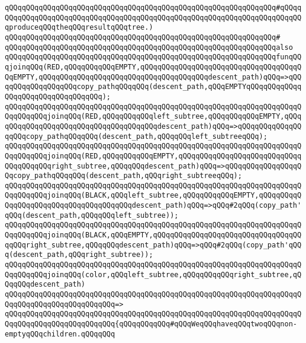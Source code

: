 \verb|qQQqqQQqqQQqqQQqqQQqqQQqqQQqqQQqqQQqqQQqqQQqqQQqqQQqqQQqqQQqqQQq#qQQqqQQqqQQqqQQqqQQqqQQqqQQqqQQqqQQqqQQqqQQqqQQqqQQqqQQqqQQqqQQqqQQqqQQqqQQqproduceqQQqtheqQQqresultqQQqtree.)|\newline
\verb|qQQqqQQqqQQqqQQqqQQqqQQqqQQqqQQqqQQqqQQqqQQqqQQqqQQqqQQqqQQqqQQq#|\newline
\verb|qQQqqQQqqQQqqQQqqQQqqQQqqQQqqQQqqQQqqQQqqQQqqQQqqQQqqQQqqQQqqQQqalso|\newline
\verb|qQQqqQQqqQQqqQQqqQQqqQQqqQQqqQQqqQQqqQQqqQQqqQQqqQQqqQQqqQQqqQQqfunqQQqjoinqQQq(RED,qQQqqQQqqQQqEMPTY,qQQqqQQqqQQqqQQqqQQqqQQqqQQqqQQqqQQqqQQqEMPTY,qQQqqQQqqQQqqQQqqQQqqQQqqQQqqQQqqQQqqQQqdescent_path)qQQq=>qQQqqQQqqQQqqQQqqQQqcopy_pathqQQqqQQq(descent_path,qQQqEMPTYqQQqqQQqqQQqqQQqqQQqqQQqqQQqqQQqqQQq);|\newline
\verb|qQQqqQQqqQQqqQQqqQQqqQQqqQQqqQQqqQQqqQQqqQQqqQQqqQQqqQQqqQQqqQQqqQQqqQQqqQQqqQQqjoinqQQq(RED,qQQqqQQqqQQqleft_subtree,qQQqqQQqqQQqEMPTY,qQQqqQQqqQQqqQQqqQQqqQQqqQQqqQQqqQQqqQQqdescent_path)qQQq=>qQQqqQQqqQQqqQQqqQQqcopy_pathqQQqqQQq(descent_path,qQQqqQQqleft_subtreeqQQq);|\newline
\verb|qQQqqQQqqQQqqQQqqQQqqQQqqQQqqQQqqQQqqQQqqQQqqQQqqQQqqQQqqQQqqQQqqQQqqQQqqQQqqQQqjoinqQQq(RED,qQQqqQQqqQQqEMPTY,qQQqqQQqqQQqqQQqqQQqqQQqqQQqqQQqqQQqqQQqright_subtree,qQQqqQQqdescent_path)qQQq=>qQQqqQQqqQQqqQQqqQQqcopy_pathqQQqqQQq(descent_path,qQQqright_subtreeqQQq);|\newline
\verb|qQQqqQQqqQQqqQQqqQQqqQQqqQQqqQQqqQQqqQQqqQQqqQQqqQQqqQQqqQQqqQQqqQQqqQQqqQQqqQQqjoinqQQq(BLACK,qQQqleft_subtree,qQQqqQQqqQQqEMPTY,qQQqqQQqqQQqqQQqqQQqqQQqqQQqqQQqqQQqqQQqdescent_path)qQQq=>qQQq#2qQQq(copy_path'qQQq(descent_path,qQQqqQQqleft_subtree));|\newline
\verb|qQQqqQQqqQQqqQQqqQQqqQQqqQQqqQQqqQQqqQQqqQQqqQQqqQQqqQQqqQQqqQQqqQQqqQQqqQQqqQQqjoinqQQq(BLACK,qQQqEMPTY,qQQqqQQqqQQqqQQqqQQqqQQqqQQqqQQqqQQqqQQqright_subtree,qQQqqQQqdescent_path)qQQq=>qQQq#2qQQq(copy_path'qQQq(descent_path,qQQqright_subtree));|\newline
\newline
\verb|qQQqqQQqqQQqqQQqqQQqqQQqqQQqqQQqqQQqqQQqqQQqqQQqqQQqqQQqqQQqqQQqqQQqqQQqqQQqqQQqjoinqQQq(color,qQQqleft_subtree,qQQqqQQqqQQqright_subtree,qQQqqQQqdescent_path)|\newline
\verb|qQQqqQQqqQQqqQQqqQQqqQQqqQQqqQQqqQQqqQQqqQQqqQQqqQQqqQQqqQQqqQQqqQQqqQQqqQQqqQQqqQQqqQQqqQQqqQQq=>|\newline
\verb|qQQqqQQqqQQqqQQqqQQqqQQqqQQqqQQqqQQqqQQqqQQqqQQqqQQqqQQqqQQqqQQqqQQqqQQqqQQqqQQqqQQqqQQqqQQqqQQq{qQQqqQQqqQQq#qQQqWeqQQqhaveqQQqtwoqQQqnon-emptyqQQqchildren.qQQqqQQq|\newline
